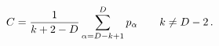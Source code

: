 \begin{equation}
\label{compact} C= {1\over k+2-D} \sum_{\alpha=D- k+1}^D p_\alpha\qquad k\ne
D-2\, .
\end{equation}

